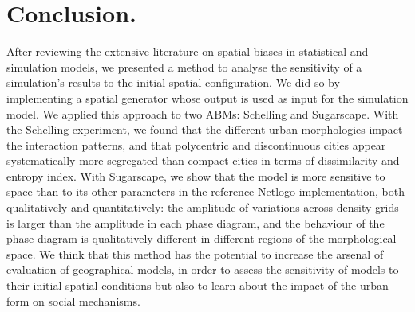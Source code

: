 \documentclass[3p,times,procedia]{elsarticle}
\begin{document}
%
%
%
%
%
%



\section{Conclusion.}

After reviewing the extensive literature on spatial biases in statistical and simulation models, we presented a method to analyse the sensitivity of a simulation's results to the initial spatial configuration. We did so by implementing a spatial generator whose output is used as input for the simulation model. We applied this approach to two  ABMs: Schelling and Sugarscape. With the Schelling experiment, we found that the different urban morphologies impact the interaction patterns, and that polycentric and discontinuous cities appear systematically more segregated than compact cities in terms of dissimilarity and entropy index. With Sugarscape, we show that the model is more sensitive to space than to its other parameters in the reference Netlogo implementation, both qualitatively and quantitatively: the amplitude of variations across density grids is larger than the amplitude in each phase diagram, and the behaviour of the phase diagram is qualitatively different in different regions of the morphological space. We think that this method has the potential to increase the arsenal of evaluation of geographical models, in order to assess the sensitivity of models to their initial spatial conditions but also to learn about the impact of the urban form on social mechanisms.

\end{document}
